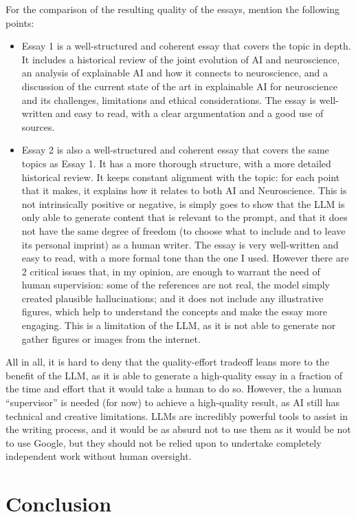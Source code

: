 \documentclass[11pt,a4paper]{article}
\begin{document}
For the comparison of the resulting quality of the essays, mention the following points:
\begin{itemize}
    \item Essay 1 is a well-structured and coherent essay that covers the topic in depth. It includes a historical review of the joint evolution of AI and neuroscience, an analysis of explainable AI and how it connects to neuroscience, and a discussion of the current state of the art in explainable AI for neuroscience and its challenges, limitations and ethical considerations. The essay is well-written and easy to read, with a clear argumentation and a good use of sources.
    \item Essay 2 is also a well-structured and coherent essay that covers the same topics as Essay 1. It has a more thorough structure, with a more detailed historical review. It keeps constant alignment with the topic: for each point that it makes, it explains how it relates to both AI and Neuroscience. This is not intrinsically positive or negative, is simply goes to show that the LLM is only able to generate content that is relevant to the prompt, and that it does not have the same degree of freedom (to choose what to include and to leave its personal imprint) as a human writer. The essay is very well-written and easy to read, with a more formal tone than the one I used. However there are 2 critical issues that, in my opinion, are enough to warrant the need of human supervision: some of the references are not real, the model simply created plausible hallucinations; and it does not include any illustrative figures, which help to understand the concepts and make the essay more engaging. This is a limitation of the LLM, as it is not able to generate nor gather figures or images from the internet.
\end{itemize}

All in all, it is hard to deny that the quality-effort tradeoff leans more to the benefit of the LLM, as it is able to generate a high-quality essay in a fraction of the time and effort that it would take a human to do so. However, the a human ``supervisor'' is needed (for now) to achieve a high-quality result, as AI still has technical and creative limitations. LLMs are incredibly powerful tools to assist in the writing process, and it would be as absurd not to use them as it would be not to use Google, but they should not be relied upon to undertake completely independent work without human oversight.


\section{Conclusion}
\end{document}
